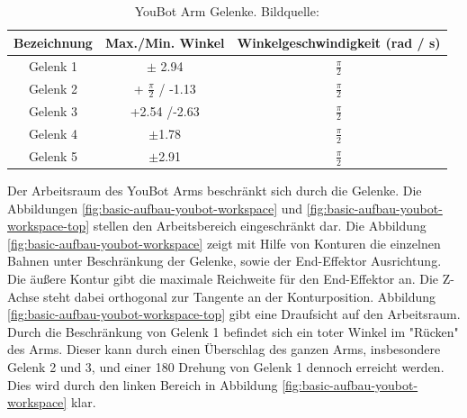    \begin{table}[H]
   	\begin{tabular}{|c|c|c|}
   		\hline Bezeichnung & Max./Min. Winkel & Winkelgeschwindigkeit (rad / s) \\ 
   		\hline Gelenk 1 & $\pm$ 2.94 & $\frac{\pi}{2}$  \\ 
   		\hline Gelenk 2 & + $\frac{\pi}{2}$ / -1.13  & $\frac{\pi}{2}$ \\ 
   		\hline Gelenk 3 & +2.54 /-2.63 & $\frac{\pi}{2}$ \\ 
   		\hline Gelenk 4 & $\pm$1.78 & $\frac{\pi}{2}$ \\ 
   		\hline Gelenk 5 & $\pm$2.91 & $\frac{\pi}{2}$ \\ 
   		\hline 
   	\end{tabular}
   	\caption[YouBot Arm Gelenke]{YouBot Arm Gelenke. Bildquelle: \cite{monikaflorekjasinska2015}}
   	\label{tab:basic-aufbau-youbot-joints}
   \end{table}
   
   Der Arbeitsraum des YouBot Arms beschränkt sich durch die Gelenke. Die Abbildungen \ref{fig:basic-aufbau-youbot-workspace} und \ref{fig:basic-aufbau-youbot-workspace-top} stellen den Arbeitsbereich eingeschränkt dar. Die Abbildung \ref{fig:basic-aufbau-youbot-workspace} zeigt mit Hilfe von Konturen die einzelnen Bahnen unter Beschränkung der Gelenke, sowie der End-Effektor Ausrichtung.  Die äußere Kontur gibt die maximale Reichweite für den End-Effektor an. Die Z-Achse steht dabei orthogonal zur Tangente an der Konturposition. Abbildung \ref{fig:basic-aufbau-youbot-workspace-top} gibt eine Draufsicht auf den Arbeitsraum. Durch die Beschränkung von Gelenk 1 befindet sich ein toter Winkel im "Rücken" des Arms. Dieser kann durch einen Überschlag des ganzen Arms, insbesondere Gelenk 2 und 3, und einer 180 \textdegree { } Drehung von Gelenk 1 dennoch erreicht werden. Dies wird durch den linken Bereich in Abbildung \ref{fig:basic-aufbau-youbot-workspace} klar.
   
